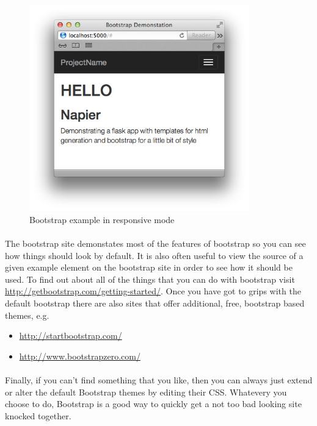 \documentclass[12pt, a4paper, twoside]{book}
\begin{document}
\begin{figure}[H]
\centering
\includegraphics[width=0.85\textwidth]{images/bootstrap-template-responsive.png}
\caption{Bootstrap example in responsive mode}
\label{fig:bootstrap-example-responsive}
\end{figure}


\paragraph{} The bootstrap site demonstates most of the features of bootstrap so you can see how things should look by default. It is also often useful to view the source of a given example element on the bootstrap site in order to see how it should be used. To find out about all of the things that you can do with bootstrap visit \url{http://getbootstrap.com/getting-started/}. Once you have got to grips with the default bootstrap there are also sites that offer additional, free, bootstrap based themes, e.g.

\begin{itemize}
\item \url{http://startbootstrap.com/}
\item \url{http://www.bootstrapzero.com/}
\end{itemize}

\paragraph{} Finally, if you can't find something that you like, then you can always just extend or alter the default Bootstrap themes by editing their CSS. Whatevery you choose to do, Bootstrap is a good way to quickly get a not too bad looking site knocked together.
\end{document}
